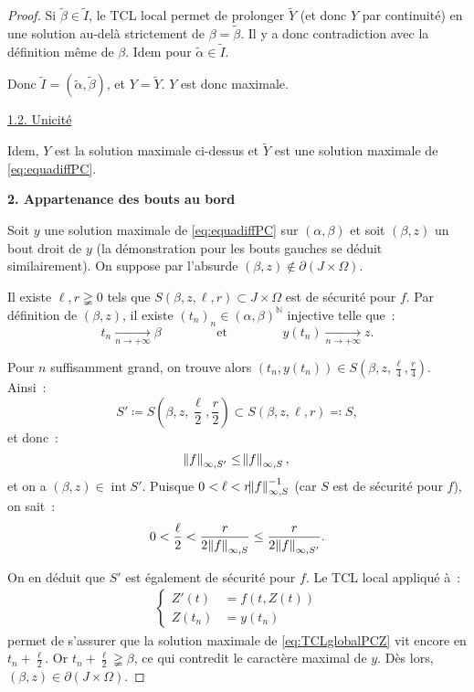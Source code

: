 \documentclass{report}
\theoremstyle{definition}
\theoremstyle{remark}
\numberwithin{equation}{section}
\newcommand{\N}{\mathbb N}
\DeclareMathOperator{\intr}{int}
\newcommand{\pinfty}{{+\infty}}
\begin{document}
\begin{proof}
					Si $\widetilde \beta \in \widetilde I$, le TCL local permet de prolonger $\widetilde Y$ (et donc $Y$ par continuité) en une solution
					au-delà strictement de $\beta = \widetilde \beta$. Il y a donc contradiction avec la définition même de $\beta$. Idem pour
					$\widetilde \alpha \in \widetilde I$.

					Donc $\widetilde I = (\widetilde \alpha, \widetilde \beta)$, et $Y = \widetilde Y$. $Y$ est donc maximale.

				\underline{1.2. Unicité}

					Idem, $Y$ est la solution maximale ci-dessus et $\widetilde Y$ est une solution maximale de \eqref{eq:equadiffPC}.  %

			\textbf{2. Appartenance des bouts au bord}

				Soit $y$ une solution maximale de \eqref{eq:equadiffPC} sur $(\alpha, \beta)$ et soit $(\beta, z)$ un bout droit de $y$ (la démonstration pour
				les bouts gauches se déduit similairement). On suppose par l'absurde $(\beta, z) \not \in \partial(J \times \Omega)$.

				Il existe $\ell, r \gneqq 0$ tels que $S(\beta, z, \ell, r) \subset J \times \Omega$ est de sécurité pour $f$. Par définition de $(\beta, z)$,
				il existe $(t_n)_n \in (\alpha, \beta)^\N$ injective telle que~:
				\begin{equation}
					t_n \xrightarrow[n \to \pinfty]{} \beta \qquad\qquad \text{ et } \qquad\qquad y(t_n) \xrightarrow[n \to \pinfty]{} z.
				\end{equation}

				Pour $n$ suffisamment grand, on trouve alors $(t_n, y(t_n)) \in S\left(\beta, z, \frac \ell4, \frac r4\right)$. Ainsi~:
				\begin{equation}
					S' \coloneqq S\left(\beta, z, \frac \ell2, \frac r2\right) \subset S(\beta, z, \ell, r) \eqqcolon S,
				\end{equation}
				et donc~:
				\begin{equation}
					\norm f_{\infty, S'} \leq \norm f_{\infty, S},
				\end{equation}
				et on a $(\beta, z) \in \intr S'$. Puisque $0 < \ell < r{\norm f_{\infty, S}^{-1}}$ (car $S$ est de sécurité pour $f$), on sait~:
				\begin{equation}
					0 < \frac \ell2 < \frac r{2\norm f_{\infty, S}} \leq \frac r{2\norm f_{\infty, S'}}.
				\end{equation}

				On en déduit que $S'$ est également de sécurité pour $f$. Le TCL local appliqué à~:
				\begin{align}\label{eq:TCLglobalPCZ}
					\begin{cases}
						Z'(t) &= f(t, Z(t)) \\
						Z(t_n) &= y(t_n)
					\end{cases}
				\end{align}
				permet de s'assurer que la solution maximale de \eqref{eq:TCLglobalPCZ} vit encore en $t_n + \frac \ell2$. Or $t_n + \frac \ell2 \gneqq \beta$,
				ce qui contredit le caractère maximal de $y$. Dès lors, $(\beta, z) \in \partial(J \times \Omega)$.
			\end{proof}
\end{document}
